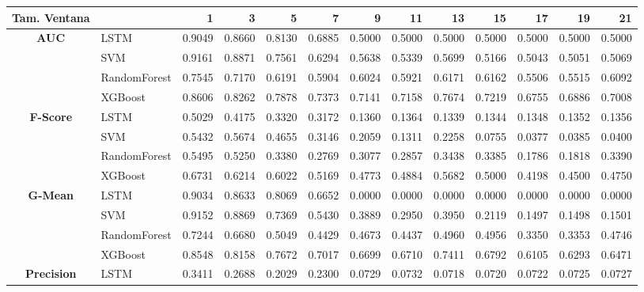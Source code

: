\begin{table}[h]
	\centering
	\begin{adjustbox}{max width=15cm}
		\begin{tabular}{|c|l|r|r|r|r|r|r|r|r|r|r|r|}
			\hline
			\textbf{Tam. Ventana} &         &      1  &      3  &      5  &      7  &      9  &      11 &      13 &      15 &      17 &      19 &      21 \\
			\hline
			\textbf{AUC} & LSTM &  0.9049 &  0.8660 &  0.8130 &  0.6885 &  0.5000 &  0.5000 &  0.5000 &  0.5000 &  0.5000 &  0.5000 &  0.5000 \\
			& SVM &  0.9161 &  0.8871 &  0.7561 &  0.6294 &  0.5638 &  0.5339 &  0.5699 &  0.5166 &  0.5043 &  0.5051 &  0.5069 \\
			& RandomForest &  0.7545 &  0.7170 &  0.6191 &  0.5904 &  0.6024 &  0.5921 &  0.6171 &  0.6162 &  0.5506 &  0.5515 &  0.6092 \\
			& XGBoost &  0.8606 &  0.8262 &  0.7878 &  0.7373 &  0.7141 &  0.7158 &  0.7674 &  0.7219 &  0.6755 &  0.6886 &  0.7008 \\
			\hline
			\textbf{F-Score} & LSTM &  0.5029 &  0.4175 &  0.3320 &  0.3172 &  0.1360 &  0.1364 &  0.1339 &  0.1344 &  0.1348 &  0.1352 &  0.1356 \\
			& SVM &  0.5432 &  0.5674 &  0.4655 &  0.3146 &  0.2059 &  0.1311 &  0.2258 &  0.0755 &  0.0377 &  0.0385 &  0.0400 \\
			& RandomForest &  0.5495 &  0.5250 &  0.3380 &  0.2769 &  0.3077 &  0.2857 &  0.3438 &  0.3385 &  0.1786 &  0.1818 &  0.3390 \\
			& XGBoost &  0.6731 &  0.6214 &  0.6022 &  0.5169 &  0.4773 &  0.4884 &  0.5682 &  0.5000 &  0.4198 &  0.4500 &  0.4750 \\
			\hline
			\textbf{G-Mean} & LSTM &  0.9034 &  0.8633 &  0.8069 &  0.6652 &  0.0000 &  0.0000 &  0.0000 &  0.0000 &  0.0000 &  0.0000 &  0.0000 \\
			& SVM &  0.9152 &  0.8869 &  0.7369 &  0.5430 &  0.3889 &  0.2950 &  0.3950 &  0.2119 &  0.1497 &  0.1498 &  0.1501 \\
			& RandomForest &  0.7244 &  0.6680 &  0.5049 &  0.4429 &  0.4673 &  0.4437 &  0.4960 &  0.4956 &  0.3350 &  0.3353 &  0.4746 \\
			& XGBoost &  0.8548 &  0.8158 &  0.7672 &  0.7017 &  0.6699 &  0.6710 &  0.7411 &  0.6792 &  0.6105 &  0.6293 &  0.6471 \\
			\hline
			\textbf{Precision} & LSTM &  0.3411 &  0.2688 &  0.2029 &  0.2300 &  0.0729 &  0.0732 &  0.0718 &  0.0720 &  0.0722 &  0.0725 &  0.0727 \\

\end{tabular}
\end{adjustbox}
\end{table}
